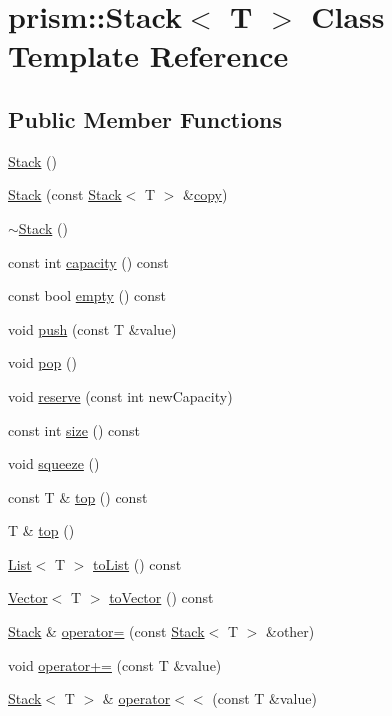 \hypertarget{classprism_1_1_stack}{}\section{prism\+:\+:Stack$<$ T $>$ Class Template Reference}
\label{classprism_1_1_stack}
\subsection*{Public Member Functions}
\begin{DoxyCompactItemize}
\item 
\hyperlink{classprism_1_1_stack_aa28cd4f7d2c39d7f3828460d662c3725}{Stack} ()
\item 
\hyperlink{classprism_1_1_stack_ae2de2835a81ce5f19d6463bb7641c44f}{Stack} (const \hyperlink{classprism_1_1_stack}{Stack}$<$ T $>$ \&\hyperlink{namespaceprism_ae776f4cd825f79e7af1cf6ee1d90a209}{copy})
\item 
\hyperlink{classprism_1_1_stack_afd4f167bfe42d9b432d3d107a4fc1657}{$\sim$\+Stack} ()
\item 
const int \hyperlink{classprism_1_1_stack_a0933dadf5810c98d2e7c0c6ea1b65a56}{capacity} () const 
\item 
const bool \hyperlink{classprism_1_1_stack_a5e7e52656e03bdea14680f59f61219f9}{empty} () const 
\item 
void \hyperlink{classprism_1_1_stack_a7fb1e3478da9ff6782e99142621f21f2}{push} (const T \&value)
\item 
void \hyperlink{classprism_1_1_stack_a9c5679c5b671e0fc79d00c53462686a4}{pop} ()
\item 
void \hyperlink{classprism_1_1_stack_ae4e7c5bfe1435e87b4d2b4bac5ff749b}{reserve} (const int new\+Capacity)
\item 
const int \hyperlink{classprism_1_1_stack_ae51ff6d366bbaca46e60e3445e74b52b}{size} () const 
\item 
void \hyperlink{classprism_1_1_stack_ac80cada72fa44835425cd86f530cd64b}{squeeze} ()
\item 
const T \& \hyperlink{classprism_1_1_stack_aece719254e007303fb8f5ff60ee56356}{top} () const 
\item 
T \& \hyperlink{classprism_1_1_stack_a2533f4bdbca74126651265b14e3a7fd0}{top} ()
\item 
\hyperlink{classprism_1_1_list}{List}$<$ T $>$ \hyperlink{classprism_1_1_stack_afb90321f16642cbb8a8cf4f2823830db}{to\+List} () const 
\item 
\hyperlink{classprism_1_1_vector}{Vector}$<$ T $>$ \hyperlink{classprism_1_1_stack_ab5a8fae1be4f7ca043d6d887e508b5e5}{to\+Vector} () const 
\item 
\hyperlink{classprism_1_1_stack}{Stack} \& \hyperlink{classprism_1_1_stack_a802286bc96a5827abca43d655395d0b0}{operator=} (const \hyperlink{classprism_1_1_stack}{Stack}$<$ T $>$ \&other)
\item 
void \hyperlink{classprism_1_1_stack_a6a8ec445b5503fdc5e3358dd1b100a9c}{operator+=} (const T \&value)
\item 
\hyperlink{classprism_1_1_stack}{Stack}$<$ T $>$ \& \hyperlink{classprism_1_1_stack_ad75cab3f3f8552c7e80ab9329a742308}{operator$<$$<$} (const T \&value)
\end{DoxyCompactItemize}
